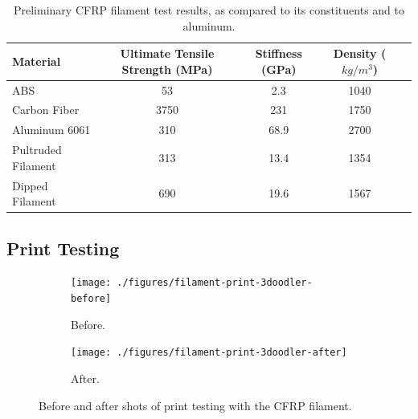 \begin{table}[h]
    \centering
    \begin{tabular}{lcccc}
        Material           & Ultimate Tensile Strength (MPa)   & Stiffness (GPa)    & Density ($ kg/m^{3} $)  \\ \hline
        ABS                & 53                                & 2.3                & 1040 \\
        Carbon Fiber       & 3750                              & 231                & 1750 \\
        Aluminum 6061      & 310                               & 68.9               & 2700 \\
        Pultruded Filament & 313                               & 13.4               & 1354 \\ 
        Dipped Filament    & 690                               & 19.6               & 1567 \\
    \end{tabular}
    \caption{Preliminary CFRP filament test results, as compared to its constituents and to aluminum.}
    \label{tab:test-results}
\end{table}

\clearpage

\subsection{Print Testing}

\indent

\begin{figure}[h!]
        \centering
        \begin{subfigure}[b]{0.3\textwidth}
                \texttt{[image: ./figures/filament-print-3doodler-before]}
                \caption{Before.}
                \label{fig:filament-print-3doodler-before}
        \end{subfigure}
        \begin{subfigure}[b]{0.3\textwidth}
                \texttt{[image: ./figures/filament-print-3doodler-after]}
                \caption{After.}
                \label{fig:filament-print-3doodler-after}
        \end{subfigure}
        \caption{Before and after shots of print testing with the CFRP filament.}\label{fig:filament-print-test}
\end{figure}

